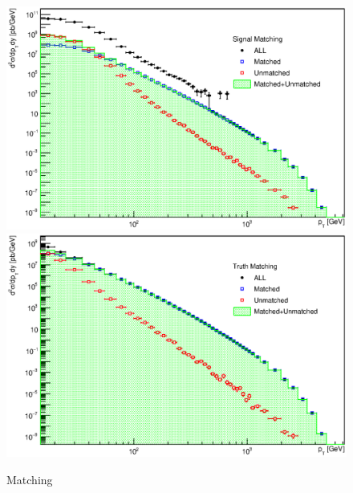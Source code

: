 \begin{appendices}
\begin{figure}[p]
  \centering
  \includegraphics[width=\textwidth]{Chapter3/SignalMatching.eps}
  \includegraphics[width=\textwidth]{Chapter3/TruthMatching.eps}
  \caption{Matching}
  \label{fig:Matching}
\end{figure}


\end{appendices}
